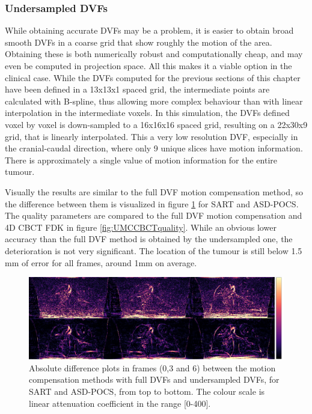 \subsubsection{Undersampled DVFs}
While obtaining accurate DVFs may be a problem, it is easier to obtain broad smooth DVFs in a coarse grid that show roughly the motion of the area. Obtaining these is both numerically robust and computationally cheap, and may even be  computed in projection space. All this makes it a viable option in the clinical case. While the DVFs computed for the previous sections of this chapter have been defined in a 13x13x1 spaced grid, the intermediate points are calculated with B-spline, thus allowing more complex behaviour than with linear interpolation in the intermediate voxels. In this simulation, the DVFs defined voxel by voxel is down-sampled to a 16x16x16 spaced grid, resulting on a 22x30x9 grid, that is linearly interpolated. This a very low resolution DVF, especially in the cranial-caudal direction, where only 9 unique slices have motion information. There is approximately a single value of motion information for the entire tumour.

Visually the results are similar to the full DVF motion compensation method, so the difference between them is visualized in figure \ref{fig:UMCCBCT3static} for SART and ASD-POCS. The quality parameters are compared to the full DVF motion compensation and 4D CBCT FDK in figure \ref{fig:UMCCBCTquality}. While an obvious lower accuracy than the full DVF method is obtained by the undersampled one, the deterioration is not very significant. The location of the tumour is still below 1.5 mm of error for all frames, around 1mm on average.

\begin{figure}
\begin{center}

\includegraphics[width=\textwidth]{accuracyMC/diffUMCCBCT3stage.png} 


\end{center}

\caption[Three difference frames of the undersampled motion compensation methods]{\label{fig:UMCCBCT3static} Absolute difference plots in frames (0,3 and 6) between the motion compensation methods with full DVFs and undersampled DVFs, for SART and ASD-POCS, from top to bottom.  The colour scale is linear attenuation coefficient in the range [0-400].} 
\end{figure}


